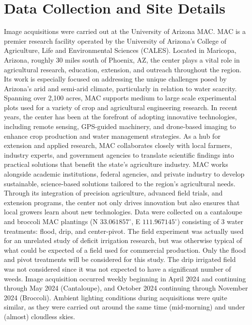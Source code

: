 \documentclass[letterpaper, notitlepage]{report}
\begin{document}
\section{Data Collection and Site Details}
Image acquisitions were carried out at the University of Arizona \gls{MAC}. MAC is a premier research facility operated by the University of Arizona's College of Agriculture, Life and Environmental Sciences (CALES). Located in Maricopa, Arizona, roughly 30 miles south of Phoenix, AZ, the center plays a vital role in agricultural research, education, extension, and outreach throughout the region. Its work is especially focused on addressing the unique challenges posed by Arizona’s arid and semi-arid climate, particularly in relation to water scarcity. Spanning over 2,100 acres, MAC supports medium to large scale experimental plots used for a variety of crop and agricultural engineering research. In recent years, the center has been at the forefront of adopting innovative technologies, including remote sensing, GPS-guided machinery, and drone-based imaging to enhance crop production and water management strategies. As a hub for extension and applied research, MAC collaborates closely with local farmers, industry experts, and government agencies to translate scientific findings into practical solutions that benefit the state’s agriculture industry. 
MAC works alongside academic institutions, federal agencies, and private industry to develop sustainable, science-based solutions tailored to the region's agricultural needs. Through its integration of precision agriculture, advanced field trials, and extension programs, the center not only drives innovation but also ensures that local growers learn about new technologies.
Data were collected on a cantaloupe and broccoli MAC plantings (N $33.061857^\circ$, E $111.967145^\circ$) consisting of 3 water treatments: flood, drip, and center-pivot. The field experiment was actually used for an unrelated study of deficit irrigation research, but was otherwise typical of what could be expected of a field used for commercial production. Only the flood and pivot treatments will be considered for this study. The drip irrigated field was not considered since it was not expected to have a significant number of weeds.  Image acquisition occurred weekly beginning in April 2024 and continuing through May 2024 (Cantaloupe), and October 2024 continuing through November 2024 (Broccoli).  Ambient lighting conditions during acquisitions were quite similar, as they were carried out around the same time (mid-morning) and under (almost) cloudless skies.
\end{document}
